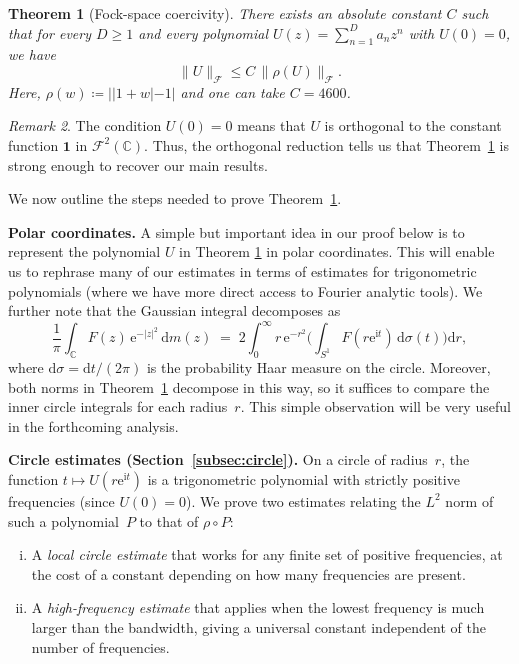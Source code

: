 \documentclass[11pt]{amsart}
\newtheorem{theorem}{Theorem}[section]
\theoremstyle{remark}
\newtheorem{remark}[theorem]{Remark}
\newcommand{\norm}[1]{\lVert #1 \rVert}
\begin{document}
\begin{theorem}[Fock-space coercivity]\label{thm:orthog}
There exists an absolute constant $C$ such that for every $D \ge 1$ and every polynomial
$U(z) = \sum_{n=1}^D a_n z^n$ with $U(0) = 0$, we have
\[
  \norm{U}_{\mathcal{F}} \le C\,\norm{\rho(U)}_\mathcal{F}.
\]
Here, $\rho(w)\coloneq ||1+w|-1|$ and one can take $C = 4600$.
\end{theorem}
\begin{remark}
  The condition $U(0) = 0$ means that $U$ is orthogonal to the constant
function $\mathbf{1}$ in $\mathcal{F}^2(\mathbb{C})$. Thus, the orthogonal reduction tells us that Theorem~\ref{thm:orthog} is strong enough to recover our main results.
\end{remark}

We now outline the steps needed to prove Theorem~\ref{thm:orthog}.
\medskip

\noindent
\textbf{Polar coordinates.}\;
A simple but important idea in our proof below is to represent the polynomial $U$ in Theorem \ref{thm:orthog} in polar coordinates. This will enable us to rephrase many of our estimates in terms of estimates for trigonometric polynomials (where we have more direct access to Fourier analytic tools). We further note that the Gaussian integral decomposes as
\begin{equation}\label{eq:polar}
\frac{1}{\pi}\int_{\mathbb{C}} F(z)\, \mathrm{e}^{-\lvert z \rvert^2}\,\mathrm{d} m(z)
\;=\;
2\int_0^\infty r\,\mathrm{e}^{-r^2}
\biggl(\int_{S^1} F(r\mathrm{e}^{\mathrm{i} t})\,\mathrm{d}\sigma(t)\biggr)\mathrm{d} r,
\end{equation}
where $\mathrm{d}\sigma = \mathrm{d} t/(2\pi)$ is the probability Haar measure on the
circle. Moreover, both norms in Theorem~\ref{thm:orthog} decompose in this way, so it
suffices to compare the inner circle integrals for each radius~$r$. This simple observation will be very useful in the forthcoming analysis.

\medskip
\noindent
\textbf{Circle estimates (Section~\ref{subsec:circle}).}\;
On a circle of radius~$r$, the function $t \mapsto U(r\mathrm{e}^{\mathrm{i} t})$ is a
trigonometric polynomial with strictly positive frequencies (since
$U(0) = 0$).  We prove two estimates relating the $L^2$ norm of such a
polynomial~$P$ to that of $\rho \circ P$:
\begin{enumerate}[(i)]
\item A \emph{local circle estimate} that works for any finite set of
  positive frequencies, at the cost of a constant depending on how many
  frequencies are present.

\item A \emph{high-frequency estimate} that applies when the lowest
  frequency is much larger than the bandwidth, giving a universal constant
  independent of the number of frequencies.
\end{enumerate}
\end{document}
